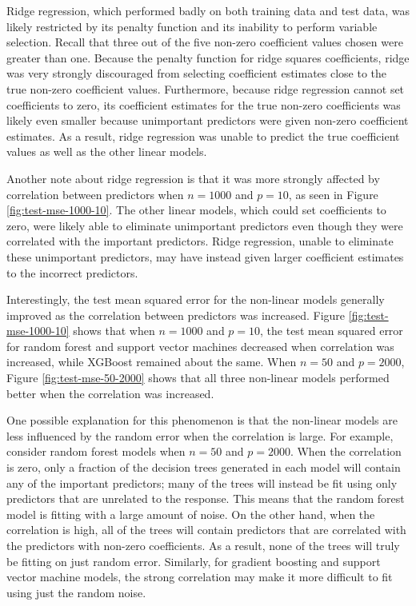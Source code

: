 \documentclass{article}
\begin{document}
Ridge regression, which performed badly on both training data and test data, was likely restricted by its penalty function and its inability to perform variable selection. Recall that three out of the five non-zero coefficient values chosen were greater than one. Because the penalty function for ridge squares coefficients, ridge was very strongly discouraged from selecting coefficient estimates close to the true non-zero coefficient values. Furthermore, because ridge regression cannot set coefficients to zero, its coefficient estimates for the true non-zero coefficients was likely even smaller because unimportant predictors were given non-zero coefficient estimates. As a result, ridge regression was unable to predict the true coefficient values as well as the other linear models.

Another note about ridge regression is that it was more strongly affected by correlation between predictors when $n = 1000$ and $p = 10$, as seen in Figure \ref{fig:test-mse-1000-10}. The other linear models, which could set coefficients to zero, were likely able to eliminate unimportant predictors even though they were correlated with the important predictors. Ridge regression, unable to eliminate these unimportant predictors, may have instead given larger coefficient estimates to the incorrect predictors.

Interestingly, the test mean squared error for the non-linear models generally improved as the correlation between predictors was increased. Figure \ref{fig:test-mse-1000-10} shows that when $n = 1000$ and $p = 10$, the test mean squared error for random forest and support vector machines decreased when correlation was increased, while XGBoost remained about the same. When $n = 50$ and $p = 2000$, Figure \ref{fig:test-mse-50-2000} shows that all three non-linear models performed better when the correlation was increased.

One possible explanation for this phenomenon is that the non-linear models are less influenced by the random error when the correlation is large. For example, consider random forest models when $n = 50$ and $p = 2000$. When the correlation is zero, only a fraction of the decision trees generated in each model will contain any of the important predictors; many of the trees will instead be fit using only predictors that are unrelated to the response. This means that the random forest model is fitting with a large amount of noise. On the other hand, when the correlation is high, all of the trees will contain predictors that are correlated with the  predictors with non-zero coefficients. As a result, none of the trees will truly be fitting on just random error. Similarly, for gradient boosting and support vector machine models, the strong correlation may make it more difficult to fit using just the random noise.
\end{document}
